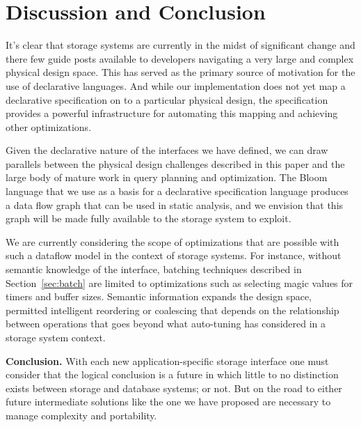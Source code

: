 \section{Discussion and Conclusion}
\label{sec:opts}

It's clear that storage systems are currently in the midst of significant
change and there few guide posts available to developers navigating a very
large and complex physical design space. This has served as the primary source
of motivation for the use of declarative languages. And while our
implementation does not yet map a declarative specification on to a particular
physical design, the specification provides a powerful infrastructure for
automating this mapping and achieving other optimizations.

Given the declarative nature of the interfaces we have defined, we can draw
parallels between the physical design challenges described in this paper and
the large body of mature work in query planning and optimization.  The Bloom
language that we use as a basis for a declarative specification language
produces a data flow graph that can be used in static analysis, and we
envision that this graph will be made fully available to the storage system to
exploit.

We are currently considering the scope of optimizations that are possible with
such a dataflow model in the context of storage systems. For instance, without
semantic knowledge of the interface, batching techniques described in
Section~\ref{sec:batch} are limited to optimizations such as selecting magic
values for timers and buffer sizes. Semantic information expands the design
space, permitted intelligent reordering or coalescing that depends on the
relationship between operations that goes beyond what auto-tuning has
considered in a storage system context.

{\bf Conclusion.} With each new application-specific storage interface one
must consider that the logical conclusion is a future in which little to no
distinction exists between storage and database systems; or not. But on the
road to either future intermediate solutions like the one we have proposed are
necessary to manage complexity and portability.

